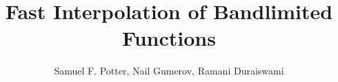 \documentclass{article}
\title{Fast Interpolation of Bandlimited Functions}
\author{Samuel F. Potter, Nail Gumerov, Ramani Duraiswami}
\begin{document}
\maketitle



\tableofcontents












\appendix


\clearpage
{}

\end{document}
